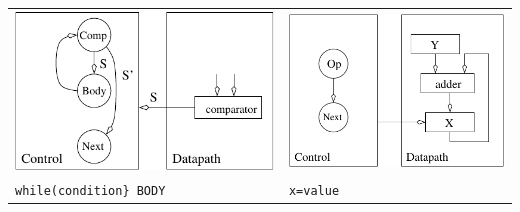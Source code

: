 \begin{tabular}{|l|l|}
\includegraphics{./Fig8/While}	& \includegraphics{./Fig8/Op}	\\
\verb+while(condition} BODY+	& \verb+x=value+ 		\\ \hline
\end{tabular}



